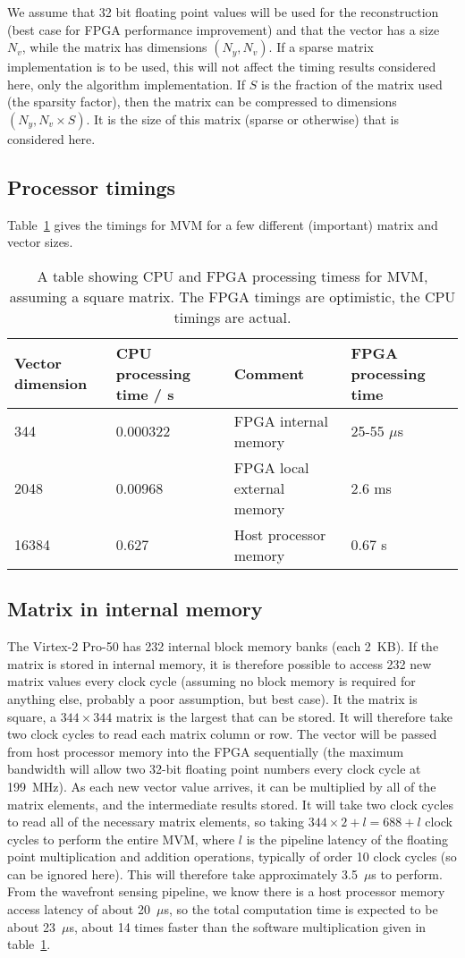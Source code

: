 \documentclass{article}
\begin{document}
We assume that 32 bit floating point values will be used for the
reconstruction (best case for FPGA performance improvement) and that
the vector has a size $N_v$, while the matrix has dimensions $(N_y,
N_v)$.  If a sparse matrix implementation is to be used, this will not
affect the timing results considered here, only the algorithm
implementation.  If $S$ is the fraction of the matrix used (the
sparsity factor), then the matrix can be compressed to dimensions
$(N_y, N_v\times S)$.  It is the size of this matrix (sparse or
otherwise) that is considered here.

\subsection{Processor timings}
Table~\ref{tab:cputime} gives the timings for MVM for a few different
(important) matrix and vector sizes.
\begin{table}
\begin{tabular}{llll}\hline
Vector dimension & CPU processing time / s & Comment & FPGA processing
time\\ \hline
344 & 0.000322 & FPGA internal memory & 25-55 $\mu$s\\
2048 & 0.00968 & FPGA local external memory & 2.6 ms\\
16384 & 0.627 & Host processor memory & 0.67 s\\ \hline
\end{tabular}
\caption{A table showing CPU and FPGA processing timess for MVM, assuming a
square matrix.  The FPGA timings are optimistic, the CPU timings are actual.}
\label{tab:cputime}
\end{table}

\subsection{Matrix in internal memory}
The Virtex-2 Pro-50 has 232 internal block memory banks (each 2~KB).  
If the matrix is stored in internal memory, it is therefore possible
to access 232 new matrix values every clock cycle (assuming no block
memory is required for anything else, probably a poor assumption, but
best case).  It the matrix is square, a $344\times344$ matrix is the
largest that can be stored.  It will therefore take two clock cycles
to read each matrix column or row.  The vector will be passed from
host processor memory into the FPGA sequentially (the maximum
bandwidth will allow two 32-bit floating point numbers every clock
cycle at 199~MHz).  As each new vector value arrives, it can be
multiplied by all of the matrix elements, and the intermediate results
stored.  It will take two clock cycles to read all of the necessary
matrix elements, so taking $344\times2+l=688+l$ clock cycles to perform
the entire MVM, where $l$ is the pipeline latency of the floating
point multiplication and addition operations, typically of order 10
clock cycles (so can be ignored here).  This will therefore take
approximately 3.5~$\mu$s to perform.  From the wavefront sensing
pipeline, we know there is a host processor memory access latency of
about 20~$\mu$s, so the total computation time is expected to be about
23~$\mu$s, about 14 times faster than the software multiplication given
in table~\ref{tab:cputime}.
\end{document}
